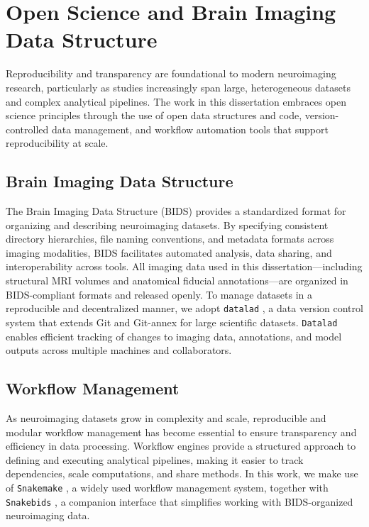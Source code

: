 \section{Open Science and Brain Imaging Data Structure}

Reproducibility and transparency are foundational to modern neuroimaging research, particularly as studies increasingly span large, heterogeneous datasets and complex analytical pipelines. The work in this dissertation embraces open science principles through the use of open data structures and code, version-controlled data management, and workflow automation tools that support reproducibility at scale.

\subsection{Brain Imaging Data Structure}

The Brain Imaging Data Structure (BIDS) \cite{Gorgolewski2016-oh} provides a standardized format for organizing and describing neuroimaging datasets. By specifying consistent directory hierarchies, file naming conventions, and metadata formats across imaging modalities, BIDS facilitates automated analysis, data sharing, and interoperability across tools. All imaging data used in this dissertation—including structural MRI volumes and anatomical fiducial annotations—are organized in BIDS-compliant formats and released openly. To manage datasets in a reproducible and decentralized manner, we adopt \texttt{datalad} \cite{Halchenko2021-px}, a data version control system that extends Git and Git-annex for large scientific datasets. \texttt{Datalad} enables efficient tracking of changes to imaging data, annotations, and model outputs across multiple machines and collaborators.

\subsection{Workflow Management}
As neuroimaging datasets grow in complexity and scale, reproducible and modular workflow management has become essential to ensure transparency and efficiency in data processing. Workflow engines provide a structured approach to defining and executing analytical pipelines, making it easier to track dependencies, scale computations, and share methods. In this work, we make use of \texttt{Snakemake} \cite{Molder2021-ig,Koster2012-ok}, a widely used workflow management system, together with \texttt{Snakebids} \cite{Van-Dyken2025-cn}, a companion interface that simplifies working with BIDS-organized neuroimaging data.

